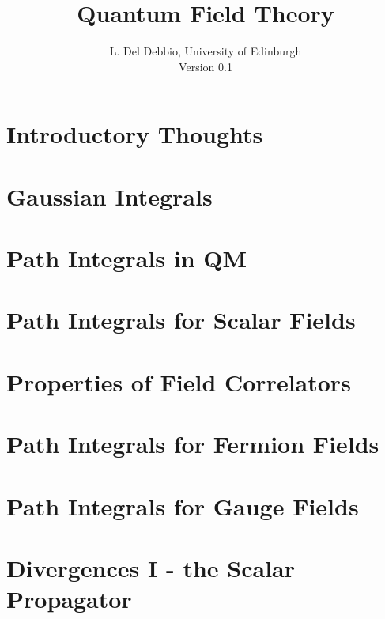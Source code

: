 \documentclass[11pt,twoside]{report}
\begin{document}
\title{Quantum Field Theory}
\author{L. Del Debbio, University of Edinburgh \\
  Version 0.1}

\maketitle
\clearemptydoublepage
\tableofcontents
\clearemptydoublepage


\chapter{Introductory Thoughts}
\label{chap:intro}


\chapter{Gaussian Integrals}
\label{chap:lec0}


\chapter{Path Integrals in QM}
\label{chap:lec1}


\chapter{Path Integrals for Scalar Fields}
\label{cha:path-integr-scal}


\chapter{Properties of Field Correlators}
\label{cha:prop-corrs}


\chapter{Path Integrals for Fermion Fields}
\label{cha:path-integr-ferm}

\chapter{Path Integrals for Gauge Fields}
\label{cha:path-integrals-gauge}

\chapter{Divergences I - the Scalar Propagator}
\label{cha:divergences-i-scalar}
\end{document}

